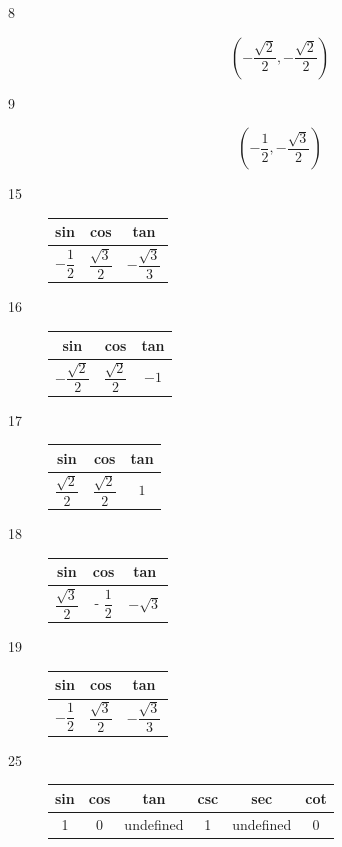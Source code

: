 \documentclass[fleqn,addpoints]{exam}
\begin{document}
\begin{description}
\item[8]
\[
  \left( - \frac{\sqrt{2}}{2}, - \frac{\sqrt{2}}{2} \right)
\]

\item[9]
\[
  \left( - \frac{1}{2}, -\frac{\sqrt{3}}{2} \right)
\]

\item[15]
\begin{tabular}{ccc}
\toprule
sin & cos & tan \\
\midrule
$-\dfrac{1}{2}$ & $\dfrac{\sqrt{3}}{2}$  & $- \dfrac{\sqrt{3}}{3}$  \\
\bottomrule
\end{tabular}

\item[16]
\begin{tabular}{ccc}
\toprule
sin & cos & tan \\
\midrule
$-\dfrac{\sqrt{2}}{2}$ & $\dfrac{\sqrt{2}}{2}$  & $ -1$  \\
\bottomrule
\end{tabular}

\item[17]
\begin{tabular}{ccc}
\toprule
sin & cos & tan \\
\midrule
$\dfrac{\sqrt{2}}{2}$ & $\dfrac{\sqrt{2}}{2}$  & $ 1$  \\
\bottomrule
\end{tabular}

\item[18]
\begin{tabular}{ccc}
\toprule
sin & cos & tan \\
\midrule
$\dfrac{\sqrt{3}}{2}$ & - $\dfrac{1}{2}$  & $- \sqrt{3}$  \\
\bottomrule
\end{tabular}

\item[19]
\begin{tabular}{ccc}
\toprule
sin & cos & tan \\
\midrule
$-\dfrac{1}{2}$ & $\dfrac{\sqrt{3}}{2}$  & $ -\dfrac{\sqrt{3}}{3}$  \\
\bottomrule
\end{tabular}

\item[25]
\begin{tabular}{cccccc}
\toprule
sin & cos & tan        & csc & sec       & cot  \\
\midrule
1   & 0   & undefined  & 1   & undefined & 0 \\
\bottomrule
\end{tabular}


\end{description}
\end{document}
